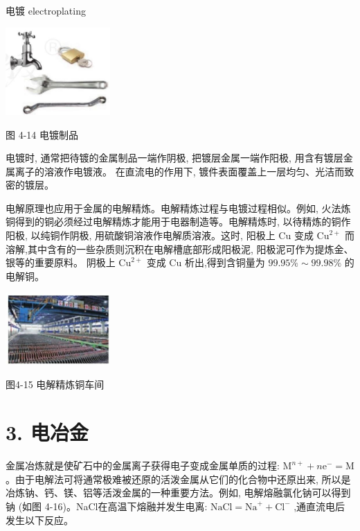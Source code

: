 \documentclass[10pt]{article}
\begin{document}
电镀 electroplating

\begin{center}
\includegraphics[max width=0.3\textwidth]{images/0190da9d-8bfd-732f-bc2c-0b21d0f13b91_112_513580.jpg}
\end{center}

图 4-14 电镀制品

电镀时, 通常把待镀的金属制品一端作阴极, 把镀层金属一端作阳极, 用含有镀层金属离子的溶液作电镀液。 在直流电的作用下, 镀件表面覆盖上一层均匀、光洁而致密的镀层。

电解原理也应用于金属的电解精炼。电解精炼过程与电镀过程相似。例如, 火法炼铜得到的铜必须经过电解精炼才能用于电器制造等。电解精炼时, 以待精炼的铜作阳极, 以纯铜作阴极, 用硫酸铜溶液作电解质溶液。这时, 阳极上 \(\mathrm{{Cu}}\) 变成 \({\mathrm{{Cu}}}^{2 + }\) 而溶解,其中含有的一些杂质则沉积在电解槽底部形成阳极泥, 阳极泥可作为提炼金、银等的重要原料。 阴极上 \({\mathrm{{Cu}}}^{2 + }\) 变成 \(\mathrm{{Cu}}\) 析出,得到含铜量为 \({99.95}\% \sim {99.98}\%\) 的电解铜。

\begin{center}
\includegraphics[max width=0.3\textwidth]{images/0190da9d-8bfd-732f-bc2c-0b21d0f13b91_113_504974.jpg}
\end{center}

图4-15 电解精炼铜车间

\section*{3. 电冶金}

金属冶炼就是使矿石中的金属离子获得电子变成金属单质的过程: \({\mathrm{M}}^{n + } + n{\mathrm{e}}^{ - } = \mathrm{M}\) 。由于电解法可将通常极难被还原的活泼金属从它们的化合物中还原出来, 所以是冶炼钠、钙、镁、铝等活泼金属的一种重要方法。例如, 电解熔融氯化钠可以得到钠 (如图 4-16)。NaCl在高温下熔融并发生电离: \(\mathrm{{NaCl}} = {\mathrm{{Na}}}^{ + } + {\mathrm{{Cl}}}^{ - }\) ,通直流电后发生以下反应。
\end{document}
